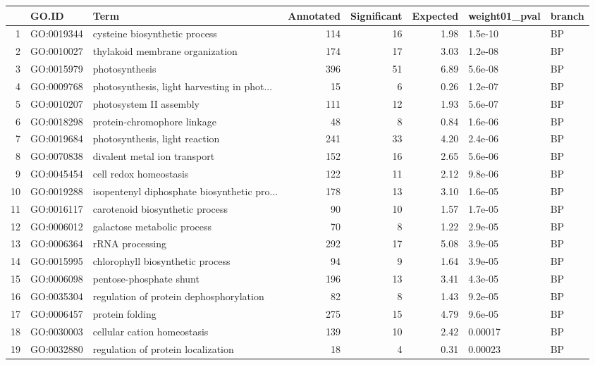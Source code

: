 \documentclass[12pt,oneside,a4paper]{article}
\begin{document}
\fontsize{0.2cm}{0.3cm}\selectfont
\centering
\begin{longtable}{rllrrrll}

  \hline
 & GO.ID & Term & Annotated & Significant & Expected & weight01\_pval & branch \\ 
  \hline
1 & GO:0019344 & cysteine biosynthetic process & 114 &  16 & 1.98 & 1.5e-10 & BP \\ 
  2 & GO:0010027 & thylakoid membrane organization & 174 &  17 & 3.03 & 1.2e-08 & BP \\ 
  3 & GO:0015979 & photosynthesis & 396 &  51 & 6.89 & 5.6e-08 & BP \\ 
  4 & GO:0009768 & photosynthesis, light harvesting in phot... &  15 &   6 & 0.26 & 1.2e-07 & BP \\ 
  5 & GO:0010207 & photosystem II assembly & 111 &  12 & 1.93 & 5.6e-07 & BP \\ 
  6 & GO:0018298 & protein-chromophore linkage &  48 &   8 & 0.84 & 1.6e-06 & BP \\ 
  7 & GO:0019684 & photosynthesis, light reaction & 241 &  33 & 4.20 & 2.4e-06 & BP \\ 
  8 & GO:0070838 & divalent metal ion transport & 152 &  16 & 2.65 & 5.6e-06 & BP \\ 
  9 & GO:0045454 & cell redox homeostasis & 122 &  11 & 2.12 & 9.8e-06 & BP \\ 
  10 & GO:0019288 & isopentenyl diphosphate biosynthetic pro... & 178 &  13 & 3.10 & 1.6e-05 & BP \\ 
  11 & GO:0016117 & carotenoid biosynthetic process &  90 &  10 & 1.57 & 1.7e-05 & BP \\ 
  12 & GO:0006012 & galactose metabolic process &  70 &   8 & 1.22 & 2.9e-05 & BP \\ 
  13 & GO:0006364 & rRNA processing & 292 &  17 & 5.08 & 3.9e-05 & BP \\ 
  14 & GO:0015995 & chlorophyll biosynthetic process &  94 &   9 & 1.64 & 3.9e-05 & BP \\ 
  15 & GO:0006098 & pentose-phosphate shunt & 196 &  13 & 3.41 & 4.3e-05 & BP \\ 
  16 & GO:0035304 & regulation of protein dephosphorylation &  82 &   8 & 1.43 & 9.2e-05 & BP \\ 
  17 & GO:0006457 & protein folding & 275 &  15 & 4.79 & 9.6e-05 & BP \\ 
  18 & GO:0030003 & cellular cation homeostasis & 139 &  10 & 2.42 & 0.00017 & BP \\ 
  19 & GO:0032880 & regulation of protein localization &  18 &   4 & 0.31 & 0.00023 & BP \\ 

\end{longtable}
\end{document}
